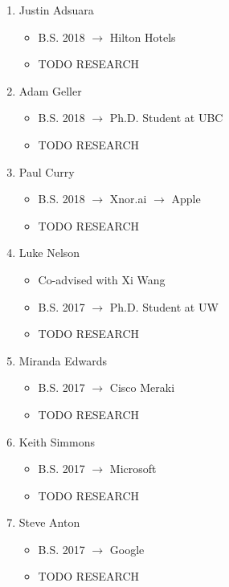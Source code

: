 \documentclass[10pt]{article}
\begin{document}
\begin{enumerate}[resume]
  \item Justin Adsuara
    \begin{itemize}
      \item B.S. 2018 $\rightarrow$ Hilton Hotels
      \item TODO RESEARCH
    \end{itemize}

  \item Adam Geller
    \begin{itemize}
      \item B.S. 2018 $\rightarrow$ Ph.D. Student at UBC
      \item TODO RESEARCH
    \end{itemize}

  \item Paul Curry
    \begin{itemize}
      \item B.S. 2018 $\rightarrow$ Xnor.ai
                      $\rightarrow$ Apple
      \item TODO RESEARCH
    \end{itemize}

  \item Luke Nelson
    \begin{itemize}
      \item Co-advised with Xi Wang
      \item B.S. 2017 $\rightarrow$ Ph.D. Student at UW
      \item TODO RESEARCH
    \end{itemize}

  \item Miranda Edwards
    \begin{itemize}
      \item B.S. 2017 $\rightarrow$ Cisco Meraki
      \item TODO RESEARCH
    \end{itemize}

  \item Keith Simmons
    \begin{itemize}
      \item B.S. 2017 $\rightarrow$ Microsoft
      \item TODO RESEARCH
    \end{itemize}

  \item Steve Anton
    \begin{itemize}
      \item B.S. 2017 $\rightarrow$ Google
      \item TODO RESEARCH
    \end{itemize}


\end{enumerate}
\end{document}
